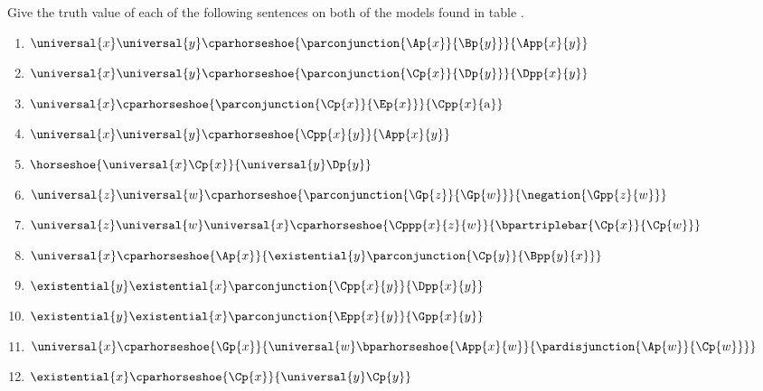 Give the truth value of each of the following sentences on both of the models found in table . 
\begin{multicols}{2}
\begin{enumerate}
\item {$\universal{\variable{x}}\universal{\variable{y}}\cparhorseshoe{\parconjunction{\Ap{\variable{x}}}{\Bp{\variable{y}}}}{\App{\variable{x}}{\variable{y}}}$}
\item {$\universal{\variable{x}}\universal{\variable{y}}\cparhorseshoe{\parconjunction{\Cp{\variable{x}}}{\Dp{\variable{y}}}}{\Dpp{\variable{x}}{\variable{y}}}$}
\item {$\universal{\variable{x}}\cparhorseshoe{\parconjunction{\Cp{\variable{x}}}{\Ep{\variable{x}}}}{\Cpp{\variable{x}}{\constant{a}}}$}
\item {$\universal{\variable{x}}\universal{\variable{y}}\cparhorseshoe{\Cpp{\variable{x}}{\variable{y}}}{\App{\variable{x}}{\variable{y}}}$}
\item {$\horseshoe{\universal{\variable{x}}\Cp{\variable{x}}}{\universal{\variable{y}}\Dp{\variable{y}}}$}
\item {$\universal{\variable{z}}\universal{\variable{w}}\cparhorseshoe{\parconjunction{\Gp{\variable{z}}}{\Gp{\variable{w}}}}{\negation{\Gpp{\variable{z}}{\variable{w}}}}$}
\item {$\universal{\variable{z}}\universal{\variable{w}}\universal{\variable{x}}\cparhorseshoe{\Cppp{\variable{x}}{\variable{z}}{\variable{w}}}{\bpartriplebar{\Cp{\variable{x}}}{\Cp{\variable{w}}}}$}
\item {$\universal{\variable{x}}\cparhorseshoe{\Ap{\variable{x}}}{\existential{\variable{y}}\parconjunction{\Cp{\variable{y}}}{\Bpp{\variable{y}}{\variable{x}}}}$}
\item {$\existential{\variable{y}}\existential{\variable{x}}\parconjunction{\Cpp{\variable{x}}{\variable{y}}}{\Dpp{\variable{x}}{\variable{y}}}$}
\item {$\existential{\variable{y}}\existential{\variable{x}}\parconjunction{\Epp{\variable{x}}{\variable{y}}}{\Gpp{\variable{x}}{\variable{y}}}$}
\item {$\universal{\variable{x}}\cparhorseshoe{\Gp{\variable{x}}}{\universal{\variable{w}}\bparhorseshoe{\App{\variable{x}}{\variable{w}}}{\pardisjunction{\Ap{\variable{w}}}{\Cp{\variable{w}}}}}$}
\item {$\existential{\variable{x}}\cparhorseshoe{\Cp{\variable{x}}}{\universal{\variable{y}}\Cp{\variable{y}}}$}

\end{enumerate}
\end{multicols}
